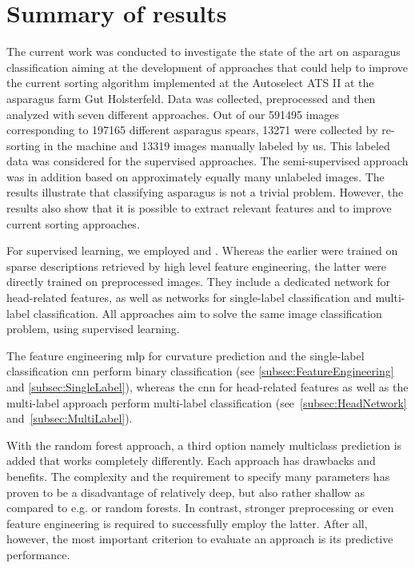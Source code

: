 \section{Summary of results}
\label{ch:Summary}

The current work was conducted to investigate the state of the art on asparagus classification aiming at the development of approaches that could help to improve the current sorting algorithm implemented at the Autoselect ATS II at the asparagus farm Gut Holsterfeld. Data was collected, preprocessed and then analyzed with seven different approaches. Out of our 591495 images corresponding to 197165 different asparagus spears, 13271 were collected by re-sorting in the machine and 13319 images manually labeled by us. This labeled data was considered for the supervised approaches. The semi-supervised approach was in addition based on approximately equally many unlabeled images. The results illustrate that classifying asparagus is not a trivial problem. However, the results also show that it is possible to extract relevant features and to improve current sorting approaches.

\bigskip
For supervised learning, we employed  and  . Whereas the earlier were trained on sparse descriptions retrieved by high level feature engineering, the latter were directly trained on preprocessed images. They include a dedicated network for head-related features, as well as networks for single-label classification and multi-label classification. All approaches aim to solve the same image classification problem, using supervised learning.

The feature engineering \acrshort{mlp} for curvature prediction and the single-label classification \acrshort{cnn} perform binary classification (see \autoref{subsec:FeatureEngineering} and \autoref{subsec:SingleLabel}), whereas the  \acrshort{cnn} for head-related features as well as the multi-label approach perform multi-label classification (see~\autoref{subsec:HeadNetwork} and~\autoref{subsec:MultiLabel}).

With the random forest approach, a third option namely multiclass prediction is added that works completely differently. Each approach has drawbacks and benefits. The complexity and the requirement to specify many parameters has proven to be a disadvantage of relatively deep, but also rather shallow  as compared to e.g.  or random forests. In contrast, stronger preprocessing or even feature engineering is required to successfully employ the latter. After all, however, the most important criterion to evaluate an approach is its predictive performance.

